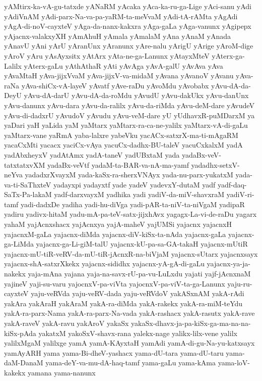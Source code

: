 {yAMtirx-ka-vA-gu-tatxde
yANaRM
yAcaka
yAca-ka-ru-ga-Lige
yAci-sanu
yAdi
yAdiVnAM
yAdi-parx-Na-va-pa-yaRM-ta-meVvaM
yAdi-tA-rAMta
yAgAdi
yAgA-di-noV-cayxteV
yAga-da-nanx-kakxra
yAga-gaLa
yAga-vanunx
yAgipepx
yAjacnx-valakxyXH
yAmAhuH
yAmala
yAmalaM
yAna
yAnaM
yAnada
yAnavU
yAni
yArU
yAranUnx
yAranunx
yAre-nalu
yArigU
yArige
yAroM-dige
yAroV
yAru
yAsAyxsitx
yAtArx
yAta-ne-ga-Lanunx
yAtayxMteV
yAterx-ga-Lalilx
yAterx-gaLu
yAthAthaR
yAti
yAvAga
yAvA-galU
yAvAva
yAva
yAvaMtaH
yAva-jijxVvaM
yAva-jijxV-va-midaM
yAvana
yAvanoV
yAvanu
yAva-raNa
yAva-shiCx-vA-layeV
yAvatf
yAve-raDu
yAvoMdu
yAvobabx
yAvu-dA-da-DeyU
yAvu-dA-darU
yAvu-dA-da-roMdu
yAvudU
yAvu-dakUkx
yAvu-danUnx
yAvu-danunx
yAvu-dara
yAvu-da-ralilx
yAvu-da-riMda
yAvu-deM-dare
yAvudeV
yAvu-di-dadxrU
yAvudoV
yAvudu
yAvu-veM-dare
yU
yUdhavxR-puMDarxM
ya
yaDari
yaH
yaLida
yaM
yaMtarx
yaMtarx-ra-ca-ne-yalilx
yaMtarx-vA-di-gaLu
yaMtarx-vane
yaRmA
yaba-lalxre
yabeVku
yacACx-satxrX-ma-ti-mAgaRM
yacaCxMti
yacacx
yaciCx-vAya
yacuCx-dadhx-BU-taleV
yacuCxkalxM
yadA
yadAbxheyxV
yadAtAmx
yadA-taneV
yadUBxtaM
yada
yadaBx-veV-tatxtatxvXM
yadaBx-veVtf
yadaM-ta-BAR-va-nA-ma-yamf
yadadhx-setxV-neYva
yadadxrXvayxM
yada-kaSx-ra-sherxVNAyx
yada-nu-parx-yukatxM
yada-va-ti-SaThxteV
yadayxpi
yadayxtf
yade
yadeV
yadevxY-dutaM
yadf
yadf-daq-SaTx-Pa-lakaM
yadf-darxvayxM
yadhika
yadi
yadiV-da-miV-shavxraM
yadiV-ri-tamf
yadi-dadxDe
yadiha
yadi-hu-diVga
yadi-pAR-ta-niV-ta-niVgaM
yadipaR
yadiru
yadivx-hitaM
yadu-mA-pa-teV-satx-jijxhAvx
yagagx-La-vi-de-raDu
yagarx
yahaM
yajAcnxshacx
yajAcnxya
yajA-maheV
yajUMSi
yajacnx
yajacnxH
yajacnxM-gaLa
yajacnx-diMda
yajacnx-diV-kiSx-ta-nAda
yajacnx-gaLa
yajacnx-ga-LiMda
yajacnx-ga-Li-giM-talU
yajacnx-kU-pa-sa-GA-takaH
yajacnx-mUtiR
yajacnx-mU-tiR-veRV-da-mU-tiR-jAcnxR-na-biVjaM
yajacnx-sUtarx
yajacnxsayx
yajacnx-shA-satxrXkekx
yajacnx-sididhx
yajacnx-yA-gA-di-gaLu
yajacnx-ya-ja-nakekx
yaja-mAna
yajana
yaja-na-savx-rU-pa-vu-LuLxdu
yajati
yajf-jAcnxnaM
yajineV
yaji-su-varu
yajocnxV-pa-viVta
yajocnxV-pa-viV-ta-ga-Lanunx
yaju-ru-cayxteV
yaju-veRVda
yaju-veRV-dada
yaju-veRVdoV
yakASxnAM
yakA-rAdi
yakAra
yakAraH
yakAraM
yakA-ra-diMda
yakA-rakekx
yakA-ra-miM-teYdu
yakA-ra-parx-Nama
yakA-ra-parx-Na-vada
yakA-rashacx
yakA-rasutx
yakA-rave
yakA-raveV
yakA-ravu
yakAroV
yakaSx
yakaSx-dhavx-ja-pa-kiSx-ga-ma-na-na-kiSx-pAda
yakatxM
yakoSxV-shavx-rana
yalekx-nage
yalikx-lilx-vene
yalilx
yalilxMgaM
yalilxge
yamA
yamA-KAyxtaH
yamAdi
yamA-di-gu-Na-yu-katxsayx
yamAyARH
yama
yama-Bi-dheV-yashacx
yama-dU-tara
yama-dU-taru
yama-daM-DanaM
yama-deY-va-mu-dA-haq-tamf
yama-gaLu
yama-kAma
yama-loV-kakekx
yamana
yama-nanunx
}
